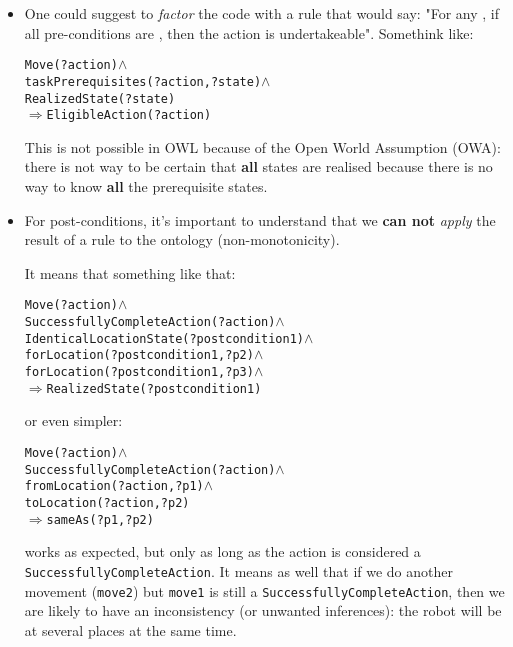 \begin{itemize}

    \item  One could suggest to \emph{factor} the code with a rule that would say:
    "For any , if all pre-conditions are , then the action is
    undertakeable". Somethink like:

    \begin{alltt}

    Move(?action) \(\land\)
    taskPrerequisites(?action, ?state) \(\land\)
    RealizedState(?state)
    \(\Rightarrow\) EligibleAction(?action)

    \end{alltt}

    This is not possible in OWL because of the Open World Assumption (OWA):
    there is not way to be certain that {\bf all} states are realised because there
    is no way to know {\bf all} the prerequisite states.

    \item  For post-conditions, it's important to understand that we {\bf can not}
    \emph{apply} the result of a rule to the ontology (non-monotonicity).

    It means that something like that:

    \begin{alltt}

    Move(?action) \(\land\)
    SuccessfullyCompleteAction(?action) \(\land\)
    IdenticalLocationState(?postcondition1) \(\land\)
    forLocation(?postcondition1, ?p2) \(\land\)
    forLocation(?postcondition1, ?p3) \(\land\)
    \(\Rightarrow\) RealizedState(?postcondition1)

    \end{alltt}

    or even simpler:

    \begin{alltt}

    Move(?action) \(\land\)
    SuccessfullyCompleteAction(?action) \(\land\)
    fromLocation(?action, ?p1) \(\land\)
    toLocation(?action, ?p2)
    \(\Rightarrow\) sameAs(?p1, ?p2)

    \end{alltt}

    works as expected, but only as long as the action is considered a {\tt
    SuccessfullyCompleteAction}. It means as well that if we do another movement
    ({\tt move2}) but {\tt move1} is still a {\tt SuccessfullyCompleteAction}, then
    we are likely to have an inconsistency (or unwanted inferences): the robot will
    be at several places at the same time.


\end{itemize}
